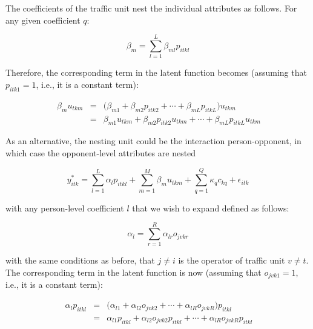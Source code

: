 \documentclass[]{elsarticle} %
\begin{document}
The coefficients of the traffic unit nest the individual attributes as
follows. For any given coefficient \(q\):

\begin{equation}
\label{eq:hierarchical-traffic-unit-coefficients}
\beta_{m}=\sum_{l=1}^L\beta_{ml}p_{itkl} 
\end{equation}

Therefore, the corresponding term in the latent function becomes
(assuming that \(p_{itk1} = 1\), i.e., it is a constant term):

\begin{equation}
\label{eq:hierarchical-traffic-unit-coefficients}
\begin{array}{rcl}\
\beta_{m}u_{tkm} &=& \big( \beta_{m1} + \beta_{m2}p_{itk2} + \cdots + \beta_{mL}p_{itkL}\big)u_{tkm}\\ 
 &=& \beta_{m1}u_{tkm} + \beta_{m2}p_{itk2}u_{tkm} + \cdots + \beta_{mL}p_{itkL}u_{tkm}
\end{array}
\end{equation}

As an alternative, the nesting unit could be the interaction
person-opponent, in which case the opponent-level attributes are nested

\begin{equation}
\label{eq:latent-function-with-opponent-variables}
y_{itk}^*=\sum_{l=1}^L\alpha_lp_{itkl} + \sum_{m=1}^M\beta_mu_{tkm} + \sum_{q=1}^Q\kappa_qc_{kq} + \epsilon_{itk}
\end{equation}

\noindent with any person-level coefficient \(l\) that we wish to expand
defined as follows:

\begin{equation}
\label{eq:hierarchical-traffic-unit-coefficients}
\alpha_{l}=\sum_{r=1}^R\alpha_{lr}o_{jvkr}
\end{equation}

\noindent with the same conditions as before, that \(j\ne i\) is the
operator of traffic unit \(v\ne t\). The corresponding term in the
latent function is now (assuming that \(o_{jvk1}=1\), i.e., it is a
constant term):

\begin{equation}
\label{eq:hierarchical-traffic-unit-coefficients}
\begin{array}{rcl}\
\alpha_{l}p_{itkl} &=& \big(\alpha_{l1} + \alpha_{l2}o_{jvk2} + \cdots + \alpha_{lR}o_{jvkR} \big)p_{itkl}\\
 &=& \alpha_{l1}p_{itkl} + \alpha_{l2}o_{jvk2}p_{itkl} + \cdots + \alpha_{lR}o_{jvkR}p_{itkl}
\end{array} 
\end{equation}
\end{document}
